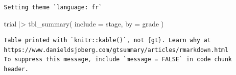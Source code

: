 \documentclass[
  letterpaper,
  DIV=11,
  numbers=noendperiod,
  oneside]{scrreprt}
\newenvironment{Shaded}{\begin{snugshade}}{\end{snugshade}}
\newcommand{\AttributeTok}[1]{\textcolor[rgb]{0.40,0.45,0.13}{#1}}
\newcommand{\FunctionTok}[1]{\textcolor[rgb]{0.28,0.35,0.67}{#1}}
\newcommand{\NormalTok}[1]{\textcolor[rgb]{0.00,0.23,0.31}{#1}}
\newcommand{\SpecialCharTok}[1]{\textcolor[rgb]{0.37,0.37,0.37}{#1}}
\begin{document}
\begin{verbatim}
Setting theme `language: fr`
\end{verbatim}

\begin{Shaded}
\begin{Highlighting}[]
\NormalTok{trial }\SpecialCharTok{|\textgreater{}} 
  \FunctionTok{tbl\_summary}\NormalTok{(}
    \AttributeTok{include =}\NormalTok{ stage,}
    \AttributeTok{by =}\NormalTok{ grade}
\NormalTok{  )}
\end{Highlighting}
\end{Shaded}

\begin{verbatim}
Table printed with `knitr::kable()`, not {gt}. Learn why at
https://www.danieldsjoberg.com/gtsummary/articles/rmarkdown.html
To suppress this message, include `message = FALSE` in code chunk header.
\end{verbatim}
\end{document}
